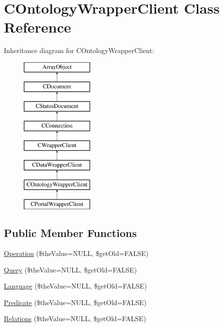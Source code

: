 \hypertarget{class_c_ontology_wrapper_client}{\section{C\-Ontology\-Wrapper\-Client Class Reference}
\label{class_c_ontology_wrapper_client}
}
Inheritance diagram for C\-Ontology\-Wrapper\-Client\-:\begin{figure}[H]
\begin{center}
\leavevmode
\includegraphics[height=8.000000cm]{class_c_ontology_wrapper_client}
\end{center}
\end{figure}
\subsection*{Public Member Functions}
\begin{DoxyCompactItemize}
\item 
\hyperlink{class_c_ontology_wrapper_client_aca024b449dd2ae6929d189d8f5a1f395}{Operation} (\$the\-Value=N\-U\-L\-L, \$get\-Old=F\-A\-L\-S\-E)
\item 
\hyperlink{class_c_ontology_wrapper_client_a9a9e404e8128831af3baf37497b46ae4}{Query} (\$the\-Value=N\-U\-L\-L, \$get\-Old=F\-A\-L\-S\-E)
\item 
\hyperlink{class_c_ontology_wrapper_client_aacba4e89c53298723dba4ac0a3918e24}{Language} (\$the\-Value=N\-U\-L\-L, \$get\-Old=F\-A\-L\-S\-E)
\item 
\hyperlink{class_c_ontology_wrapper_client_af6922f6f7204b06c6a23eef65260a3b4}{Predicate} (\$the\-Value=N\-U\-L\-L, \$get\-Old=F\-A\-L\-S\-E)
\item 
\hyperlink{class_c_ontology_wrapper_client_a274458fa0b61599f7f936cd48053b5e3}{Relations} (\$the\-Value=N\-U\-L\-L, \$get\-Old=F\-A\-L\-S\-E)
\end{DoxyCompactItemize}
